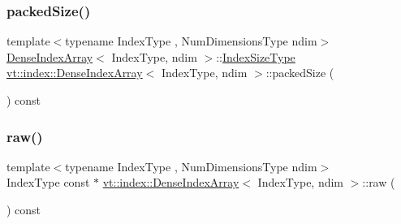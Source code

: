 \mbox{\label{structvt_1_1index_1_1_dense_index_array_aaf03d65faf2c1916de7309f2602ee13a}} 
\subsubsection{\texorpdfstring{packed\+Size()}{packedSize()}}
{\footnotesize\ttfamily template$<$typename Index\+Type , Num\+Dimensions\+Type ndim$>$ \\
\hyperlink{structvt_1_1index_1_1_dense_index_array}{Dense\+Index\+Array}$<$ Index\+Type, ndim $>$\+::\hyperlink{structvt_1_1index_1_1_dense_index_array_ae2999552165f16fc69a2940e0589819f}{Index\+Size\+Type} \hyperlink{structvt_1_1index_1_1_dense_index_array}{vt\+::index\+::\+Dense\+Index\+Array}$<$ Index\+Type, ndim $>$\+::packed\+Size (\begin{DoxyParamCaption}{ }\end{DoxyParamCaption}) const}

\mbox{\label{structvt_1_1index_1_1_dense_index_array_a2bde995d206bb72e0f5973a78e100eea}} 
\subsubsection{\texorpdfstring{raw()}{raw()}}
{\footnotesize\ttfamily template$<$typename Index\+Type , Num\+Dimensions\+Type ndim$>$ \\
Index\+Type const  $\ast$ \hyperlink{structvt_1_1index_1_1_dense_index_array}{vt\+::index\+::\+Dense\+Index\+Array}$<$ Index\+Type, ndim $>$\+::raw (\begin{DoxyParamCaption}{ }\end{DoxyParamCaption}) const}

\mbox{\label{structvt_1_1index_1_1_dense_index_array_a102b9fa9d7a34a9a6630ab89eb9d8a7f}} 
